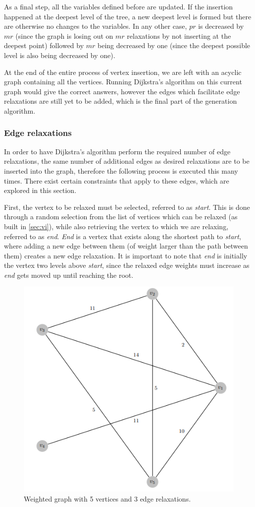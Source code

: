 \documentclass{l4proj}
\begin{document}
As a final step, all the variables defined before are updated. If the insertion happened at the deepest level of the tree, a new deepest level is formed but there are otherwise no changes to the variables. In any other case, $pr$ is decreased by $mr$ (since the graph is losing out on $mr$ relaxations by not inserting at the deepest point) followed by $mr$ being decreased by one (since the deepest possible level is also being decreased by one). 

At the end of the entire process of vertex insertion, we are left with an acyclic graph containing all the vertices. Running Dijkstra's algorithm on this current graph would give the correct answers, however the edges which facilitate edge relaxations are still yet to be added, which is the final part of the generation algorithm.

\subsubsection{Edge relaxations}

In order to have Dijkstra's algorithm perform the required number of edge relaxations, the same number of additional edges as desired relaxations are to be inserted into the graph, therefore the following process is executed this many times. There exist certain constraints that apply to these edges, which are explored in this section.

First, the vertex to be relaxed must be selected, referred to as \emph{start}. This is done through a random selection from the list of vertices which can be relaxed (as built in \autoref{sec:vi}), while also retrieving the vertex to which we are relaxing, referred to as \emph{end}. \emph{End} is a vertex that exists along the shortest path to \emph{start}, where adding a new edge between them (of weight larger than the path between them) creates a new edge relaxation. It is important to note that \emph{end} is initially the vertex two levels above \emph{start}, since the relaxed edge weights must increase as \emph{end} gets moved up until reaching the root.

\begin{figure}
    \centering
    \includegraphics[width=0.6\linewidth]{images/relaxWeight.png}    

    \caption{Weighted graph with 5 vertices and 3 edge relaxations.}
    \label{fig:relaxWeight} 
\end{figure}
\end{document}
